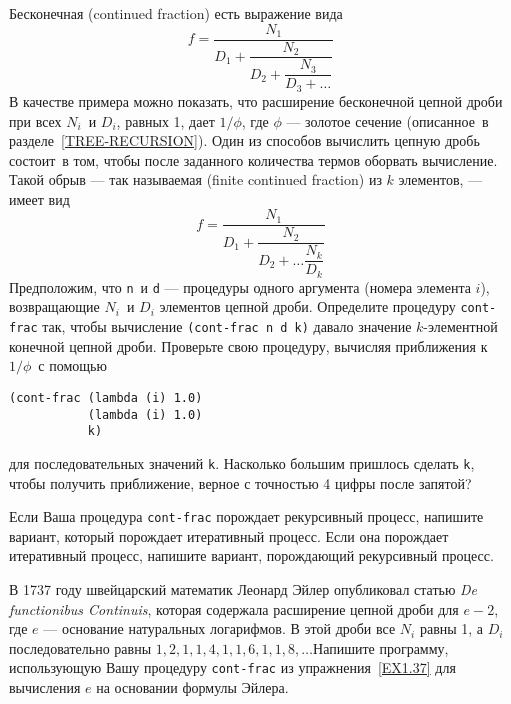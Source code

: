 \begin{exercise}[]{1.37}\label{EX1.37}%
\begin{plainenum}
\item Бесконечная (continued fraction) есть выражение вида
$$
f = \dfrac{N_1}{D_1 + \dfrac{N_2}{D_2 + \dfrac{N_3}{D_3 + \ldots}}}
$$
В качестве примера можно показать, что расширение бесконечной цепной
дроби при всех $N_i$~и $D_i$, равных 1, дает
$1 / \phi$, где $\phi$ --- золотое сечение
(описанное~в разделе~\ref{TREE-RECURSION}). Один из
способов вычислить цепную дробь состоит~в том, чтобы после заданного
количества термов оборвать вычисление.  Такой обрыв --- так называемая
 (finite continued fraction) из
$k$ элементов, --- имеет вид
$$
f = \dfrac{N_1}{D_1 + \dfrac{N_2}{D_2 + \ldots \dfrac{N_k}{D_k}}}
$$
Предположим, что {\tt n}~и {\tt d} --- процедуры одного
аргумента (номера элемента $i$), возвращающие
$N_i$~и $D_i$ элементов цепной дроби.  Определите
процедуру {\tt cont-frac} так, чтобы вычисление
{\tt (cont-frac n d k)} давало значение $k$-элементной
конечной цепной дроби.  Проверьте свою процедуру, вычисляя приближения 
к $1 / \phi$~с помощью

\begin{Verbatim}
(cont-frac (lambda (i) 1.0)
           (lambda (i) 1.0)
           k)
\end{Verbatim}

для последовательных значений {\tt k}.  Насколько большим
пришлось сделать {\tt k}, чтобы получить приближение, верное с
точностью 4 цифры после запятой?

\item Если Ваша процедура {\tt cont-frac}
порождает рекурсивный процесс, напишите вариант, который порождает
итеративный процесс.  Если она порождает итеративный процесс, напишите 
вариант, порождающий рекурсивный процесс.
\end{plainenum}
\end{exercise}
\begin{exercise}{1.38}\label{EX1.38}%
В 1737 году швейцарский математик Леонард Эйлер
опубликовал статью {\em De fun\-cti\-oni\-bus
Continuis}, которая содержала расширение цепной дроби для
$e - 2$, где $e$ --- основание натуральных
логарифмов. В этой дроби все $N_i$ равны 1, а
$D_i$ последовательно равны $1, 2, 1, 1, 4, 1, 1, 6,
1, 1, 8, \ldots$Напишите программу, использующую Вашу процедуру
{\tt cont-frac} из упражнения~\ref{EX1.37} для
вычисления $e$ на основании формулы Эйлера.
\end{exercise}
